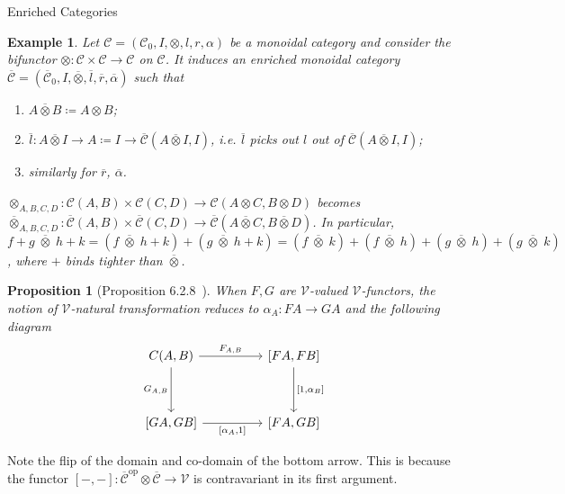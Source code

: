 \documentclass[acmsmall, screen, nonacm]{acmart}
\newtheorem{example}[theorem]{Example}
\newtheorem{proposition}[theorem]{Proposition}
\newcommand\enriched[1]{{\overline{\mathcal{#1}}}}
\begin{document}
\begin{section}{Enriched Categories}
\begin{example}
  Let $\mathcal{C} = (\mathcal{C}_{0},I,\otimes, l, r, \alpha)$ be a monoidal category and consider the bifunctor $\otimes : \mathcal{C} \times \mathcal{C} \to \mathcal{C}$ on $\mathcal{C}$.
  It induces an enriched monoidal category $\enriched{C} = (\enriched{C}_{0}, I, \enriched{\otimes}, \overline{l}, \overline{r}, \enriched{\alpha})$ such that
  \begin{enumerate}
    \item $A \overline{\otimes} B \coloneq A \otimes B$;
    \item $\overline{l} : A \overline{\otimes} I \to A \coloneq I \to \enriched{C}(A \overline{\otimes} I, I)$, i.e. $\overline{l}$ picks out $l$ out of $\enriched{C}(A \overline{\otimes} I, I)$;
    \item similarly for $\overline{r}$, $\overline{\alpha}$.
  \end{enumerate}
  $\otimes_{A,B,C,D} : \mathcal{C}(A,B) \times \mathcal{C}(C,D) \to \mathcal{C}(A \otimes C, B \otimes D)$ becomes $\overline{\otimes}_{A,B,C,D} : \enriched{C}(A,B) \times \enriched{C}(C,D) \to \enriched{C}(A \overline{\otimes} C, B \overline{\otimes} D)$.
  In particular, $f + g \;\overline{\otimes}\; h + k = (f \;\overline{\otimes}\; h + k) + (g \;\overline{\otimes}\; h + k) = (f \;\overline{\otimes}\; k) + (f \;\overline{\otimes}\; h) + (g \;\overline{\otimes}\; h) + (g \;\overline{\otimes}\; k)$, where $+$ binds tighter than $\overline{\otimes}$.
\end{example}

\begin{proposition}[Proposition 6.2.8~\cite{Borceux_1994}]
  When $F,G$ are $\mathcal{V}$-valued $\mathcal{V}$-functors, the notion of $\mathcal{V}$-natural transformation reduces to
  $\alpha_{A} : FA \to GA$ and the following diagram
  \[\begin{tikzcd}
	{C(A,B)} && {[FA,FB]} \\
	\\
	{[GA,GB]} && {[FA,GB]}
	\arrow["{F_{A,B}}", from=1-1, to=1-3]
	\arrow["{G_{A,B}}"', from=1-1, to=3-1]
	\arrow["{[1,\alpha_{B}]}", from=1-3, to=3-3]
	\arrow["{[\alpha_{A},1]}"', from=3-1, to=3-3]
\end{tikzcd}\]
\end{proposition}

Note the flip of the domain and co-domain of the bottom arrow.
This is because the functor $[-,-] : \enriched{C}^{\text{op}} \otimes \enriched{C} \to \mathcal{V}$ is contravariant in its first argument.


\end{section}
\end{document}
